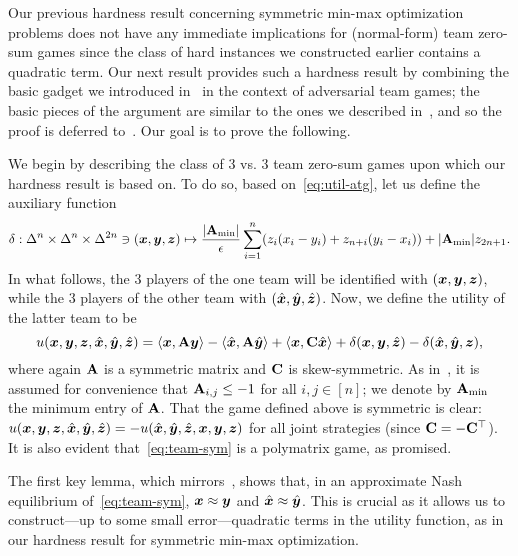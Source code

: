Our previous hardness result concerning symmetric min-max optimization problems does not have any immediate implications for (normal-form) team zero-sum games since the class of hard instances we constructed earlier contains a quadratic term. Our next result provides such a hardness result by combining the basic gadget we introduced in~ in the context of adversarial team games; the basic pieces of the argument are similar to the ones we described in~, and so the proof is deferred to~. Our goal is to prove the following.

\teamhard*

We begin by describing the class of $3$ vs. $3$ team zero-sum games upon which our hardness result is based on. To do so, based on~\eqref{eq:util-atg}, let us define the auxiliary function
\begin{equation*}
    \delta: \Delta^n \times \Delta^n \times \Delta^{2n} \ni ({\bm{x}}, {\bm{y}}, {\bm{z}}) \mapsto \frac{|\mathbf{A}_{\min}|}{\epsilon} \sum_{i=1}^n ( z_i (x_i - y_i) + z_{n+i} (y_i - x_i)) + |\mathbf{A}_{\min}| z_{2n+1}.
\end{equation*}
In what follows, the $3$ players of the one team will be identified with $({\bm{x}}, {\bm{y}}, {\bm{z}})$, while the $3$ players of the other team with $(\hat{{\bm{x}}}, \hat{{\bm{y}}}, \hat{{\bm{z}}})$. Now, we define the utility of the latter team to be
\begin{equation}
    \label{eq:team-sym}
        u({\bm{x}}, {\bm{y}}, {\bm{z}} , \hat{{\bm{x}}}, \hat{{\bm{y}}}, \hat{{\bm{z}}})  = \langle {\bm{x}}, \mathbf{A} {\bm{y}} \rangle - \langle \hat{{\bm{x}}}, \mathbf{A} \hat{{\bm{y}}} \rangle + \langle {\bm{x}}, \mathbf{C} \hat{{\bm{x}}} \rangle  + \delta({\bm{x}}, {\bm{y}}, \hat{{\bm{z}}}) - \delta(\hat{{\bm{x}}}, \hat{{\bm{y}}}, {\bm{z}}),
\end{equation}
where again $\mathbf{A}$ is a symmetric matrix and $\mathbf{C}$ is skew-symmetric. As in~, it is assumed for convenience that $\mathbf{A}_{i, j} \leq -1$ for all $i, j \in [n]$; we denote by $\mathbf{A}_{\min}$ the minimum entry of $\mathbf{A}$. That the game defined above is symmetric is clear: $u({\bm{x}}, {\bm{y}}, {\bm{z}}, \hat{{\bm{x}}}, \hat{{\bm{y}}}, \hat{{\bm{z}}}) = - u(\hat{{\bm{x}}}, \hat{{\bm{y}}}, \hat{{\bm{z}}}, {\bm{x}}, {\bm{y}}, {\bm{z}})$ for all joint strategies (since $\mathbf{C} = - \mathbf{C}^\top$). It is also evident that~\eqref{eq:team-sym} is a polymatrix game, as promised.

The first key lemma, which mirrors~, shows that, in an approximate Nash equilibrium of~\eqref{eq:team-sym}, ${\bm{x}} \approx {\bm{y}}$ and $\hat{{\bm{x}}} \approx \hat{{\bm{y}}}$. This is crucial as it allows us to construct---up to some small error---quadratic terms in the utility function, as in our hardness result for symmetric min-max optimization.

